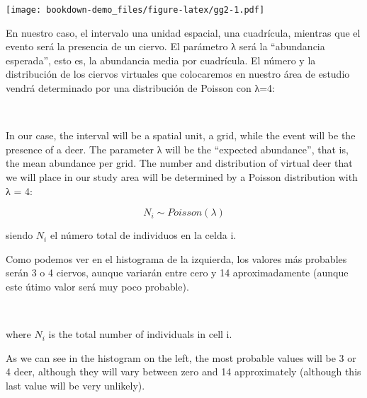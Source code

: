 \documentclass[
]{book}
\begin{document}
\begin{col}{0.45\textwidth}
\texttt{[image: bookdown-demo\_files/figure-latex/gg2-1.pdf]}

\end{col}

\begin{col}{0.45\textwidth}
En nuestro caso, el intervalo una unidad espacial, una cuadrícula, mientras que el evento será la presencia de un ciervo. El parámetro λ será la ``abundancia esperada'', esto es, la abundancia media por cuadrícula. El número y la distribución de los ciervos virtuales que colocaremos en nuestro área de estudio vendrá determinado por una distribución de Poisson con λ=4:

\end{col}

\begin{col}{0.05\textwidth}
~

\end{col}

\begin{col}{0.45\textwidth}
In our case, the interval will be a spatial unit, a grid, while the event will be the presence of a deer. The parameter λ will be the ``expected abundance'', that is, the mean abundance per grid. The number and distribution of virtual deer that we will place in our study area will be determined by a Poisson distribution with λ = 4:

\end{col}

\[ N_{i} \sim Poisson(λ) \]

\begin{col}{0.45\textwidth}
siendo \(N_{i}\) el número total de individuos en la celda i.

Como podemos ver en el histograma de la izquierda, los valores más probables serán 3 o 4 ciervos, aunque variarán entre cero y 14 aproximadamente (aunque este útimo valor será muy poco probable).

\end{col}

\begin{col}{0.05\textwidth}
~

\end{col}

\begin{col}{0.45\textwidth}
where \(N_{i}\) is the total number of individuals in cell i.

As we can see in the histogram on the left, the most probable values will be 3 or 4 deer, although they will vary between zero and 14 approximately (although this last value will be very unlikely).

\end{col}
\end{document}
